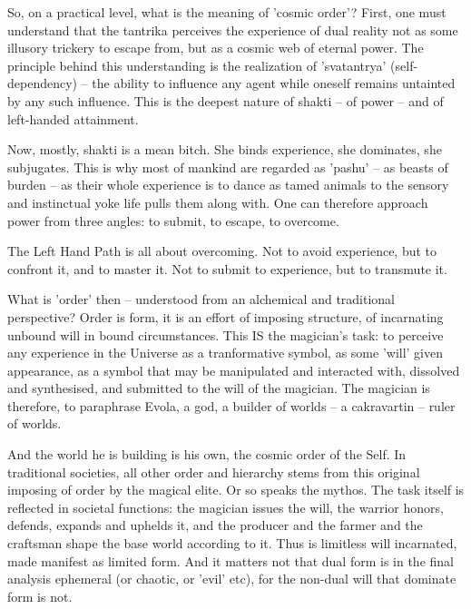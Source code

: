 \begin{footnotesize}
\begin{sffamily}
So, on a practical level, what is the meaning of 'cosmic order'? First, one must understand that the tantrika perceives the experience of dual reality not as some illusory trickery to escape from, but as a cosmic web of eternal power. The principle behind this understanding is the realization of 'svatantrya' (self-dependency) -- the ability to influence any agent while oneself remains untainted by any such influence. This is the deepest nature of shakti -- of power -- and of left-handed attainment.

Now, mostly, shakti is a mean bitch. She binds experience, she dominates, she subjugates. This is why most of mankind are regarded as 'pashu' -- as beasts of burden -- as their whole experience is to dance as tamed animals to the sensory and instinctual yoke life pulls them along with. One can therefore approach power from three angles: to submit, to escape, to overcome.

The Left Hand Path is all about overcoming. Not to avoid experience, but to confront it, and to master it. Not to submit to experience, but to transmute it.

What is 'order' then -- understood from an alchemical and traditional perspective? Order is form, it is an effort of imposing structure, of incarnating unbound will in bound circumstances. This IS the magician's task: to perceive any experience in the Universe as a tranformative symbol, as some 'will' given appearance, as a symbol that may be manipulated and interacted with, dissolved and synthesised, and submitted to the will of the magician. The magician is therefore, to paraphrase Evola, a god, a builder of worlds -- a cakravartin -- ruler of worlds.

And the world he is building is his own, the cosmic order of the Self. In traditional societies, all other order and hierarchy stems from this original imposing of order by the magical elite. Or so speaks the mythos. The task itself is reflected in societal functions: the magician issues the will, the warrior honors, defends, expands and uphelds it, and the producer and the farmer and the craftsman shape the base world according to it. Thus is limitless will incarnated, made manifest as limited form. And it matters not that dual form is in the final analysis ephemeral (or chaotic, or 'evil' etc), for the non-dual will that dominate form is not.


\end{sffamily}
\end{footnotesize}
